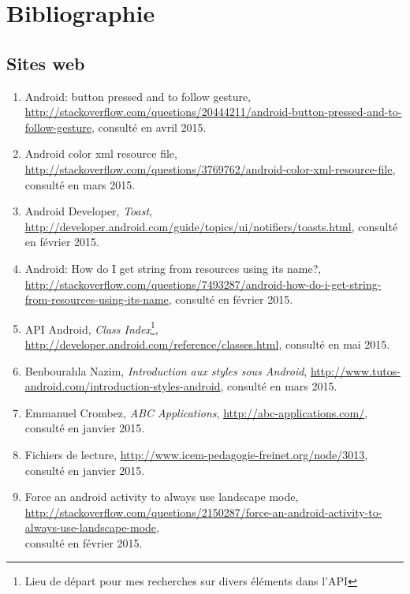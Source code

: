 \section{Bibliographie}

\subsection*{Sites web}
\begin{enumerate}
\item Android: button pressed and to follow gesture, \url{http://stackoverflow.com/questions/20444211/android-button-pressed-and-to-follow-gesture}, consulté en avril 2015.

\item Android color xml resource file, \url{http://stackoverflow.com/questions/3769762/android-color-xml-resource-file}, consulté en mars 2015.

\item Android Developer, \textit{Toast}, \url{http://developer.android.com/guide/topics/ui/notifiers/toasts.html}, consulté en février 2015.

\item Android: How do I get string from resources using its name?, \url{http://stackoverflow.com/questions/7493287/android-how-do-i-get-string-from-resources-using-its-name}, consulté en février 2015.

\item API Android, \textit{Class Index}\footnote{Lieu de départ pour mes recherches sur divers éléments dans l'API}, \url{http://developer.android.com/reference/classes.html}, consulté en mai 2015.

\item  Benbourahla Nazim, \textit{Introduction aux styles sous Android}, \url{http://www.tutos-android.com/introduction-styles-android}, consulté en mars 2015.

\item Emmanuel Crombez, \textit{ABC Applications}, \url{http://abc-applications.com/}, consulté en janvier 2015.

\item Fichiers de lecture, \url{http://www.icem-pedagogie-freinet.org/node/3013}, consulté en janvier 2015.

\item Force an android activity to always use landscape mode, \url{http://stackoverflow.com/questions/2150287/force-an-android-activity-to-always-use-landscape-mode},\\ consulté en février 2015.


\end{enumerate}

